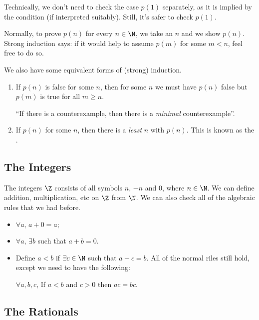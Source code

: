 \documentclass[a4]{scrartcl}
\begin{document}
\begin{remark}
	Technically, we don't need to check the case $p(1)$ separately, as it is implied by the condition (if interpreted suitably). Still, it's safer to check $p(1)$.
\end{remark}

\begin{remark}
	Normally, to prove $p(n)$ for every $n \in \N$, we take an $n$ and we show $p(n)$. Strong induction says: if it would help to assume $p(m)$ for some $m < n$, feel free to do so.
\end{remark}

We also have some equivalent forms of (strong) induction.

\begin{enumerate}
	\item If $p(n)$ is false for some $n$, then for some $n$ we must have $p(n)$ false but $p(m)$ is true for all $m \geq n$.
	
	``If there is a counterexample, then there is a \emph{minimal} counterexample''.
	\item If $p(n)$ for some $n$, then there is a \emph{least} $n$ with $p(n)$. This is known as the .
\end{enumerate}

\subsection{The Integers}

The integers $\Z$ consists of all symbols $n$, $-n$ and 0, where $n \in \N$.
We can define addition, multiplication, etc on $\Z$ from $\N$. We can also check all of the algebraic rules that we had before.

\begin{itemize}
	\item $\forall a$, $a + 0 = a$;
	\item $\forall a$, $\exists b$ such that $a + b = 0$.
	\item Define $a < b$ if $\exists c \in \N$ such that $a + c = b$. All of the normal riles still hold, except we need to have the following:
	
	$\forall a, b, c$, If $a < b$ and $c > 0$ then $ac = bc$.
\end{itemize}

\subsection{The Rationals}
\end{document}
